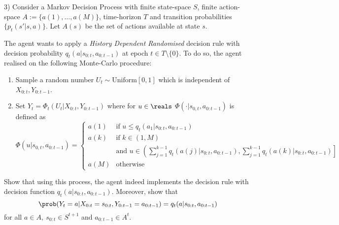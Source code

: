 \documentclass[11pt,a4paper]{article}
\begin{document}
\begin{question}{3)}
  Consider a Markov Decision Process with finite state-space $S$, finite action-space $A:=\{a(1),\dots,a(M)\}$, time-horizon $T$ and transition probabilities $\{p_t(s'|s,a)\}$. Let $A(s)$ be the set of actions available at state $s$.
  \par The agent wants to apply a \textit{History Dependent Randomised} decision rule with decision probability $q_t(a|s_{0:t},a_{0:t-1})$ at epoch $t\in T\setminus\{0\}$. To do so, the agent realised on the following Monte-Carlo procedure:
  \begin{enumerate}
    \item Sample a random number $U_t\sim\text{Uniform}[0,1]$ which is independent of $X_{0:t},Y_{0:t-1}$.
    \item Set $Y_t=\Phi_t(U_t|X_{0:t},Y_{0:t-1})$ where for $u\in\reals$ $\Phi(\cdot|s_{0,t},a_{0:t-1})$ is defined as
    \[ \Phi(u|s_{0,t},a_{0:t-1})=\begin{cases}a(1)&\text{if }u\leq q_t(a_1|s_{0:t},a_{0:t-1})\\a(k)&\text{if }k\in(1,M)\\&\text{and }u\in\left(\sum_{j=1}^{k-1}q_t(a(j)|s_{0:t},a_{0:t-1}),\sum_{j=1}^{k-1}q_t(a(k)|s_{0:t},a_{0:t-1})\right]\\a(M)&\text{otherwise}\end{cases} \]
  \end{enumerate}
  Show that using this process, the agent indeed implements the decision rule with decision function $q_t(a|s_{0:t},a_{0:t-1})$. Moreover, show that
  \[ \prob(Y_t=a|X_{0:t}=s_{0:t},Y_{0:t-1}=a_{0:t-1})=q_t(a|s_{0:t},a_{0:t-1}) \]
  for all $a\in A,\ s_{0:t}\in S^{t+1}$ and $a_{0:t-1}\in A^t$.
\end{question}
\end{document}
